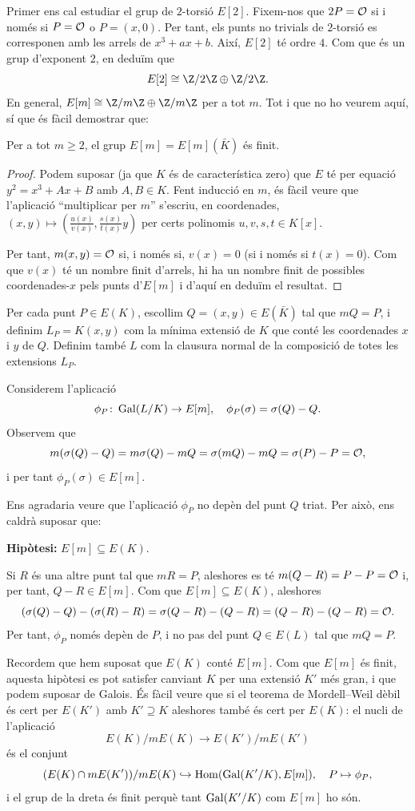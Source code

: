  Primer ens cal estudiar el grup de $2$-torsió $E[2]$. Fixem-nos que $2P=\mathcal{O}$ si i només si $P=\mathcal{O}$ o $P=(x,0)$. Per tant, els punts no trivials de $2$-torsió es corresponen amb les arrels de $x^3+ax+b$. Així, $E[2]$ té ordre $4$. Com que és un grup d'exponent $2$, en deduïm que
 \[
 E[2] \cong \Z/2\Z \oplus \Z/2\Z.
 \]
 En general, $E[m]\cong \Z/m\Z\oplus \Z/m\Z$ per a tot $m$. Tot i que no ho veurem aquí, sí que és fàcil demostrar que:
 
\begin{proposition}
Per a tot $m\geq 2$, el grup $E[m]=E[m](\bar K)$ és finit.
\end{proposition}
\begin{proof}
Podem suposar (ja que $K$ és de característica zero) que $E$ té per equació $y^2=x^3+Ax+B$ amb $A,B\in K$. Fent inducció en $m$, és fàcil veure que l'aplicació ``multiplicar per $m$'' s'escriu, en coordenades,
$(x,y)\mapsto \left(\frac{u(x)}{v(x)},\frac{s(x)}{t(x)}y\right)$ per certs polinomis $u,v,s,t\in K[x]$.

Per tant, $m(x,y) =\mathcal{O}$ si, i només si, $v(x)=0$ (si i només si $t(x)=0$). Com que $v(x)$ té un nombre finit d'arrels, hi ha un nombre finit de possibles coordenades-$x$ pels punts d'$E[m]$ i d'aquí en deduïm el resultat.
\end{proof}

Per cada punt $P\in E(K)$, escollim $Q=(x,y)\in E(\bar K)$ tal que $mQ=P$, i definim $L_P=K(x,y)$ com la mínima extensió de $K$ que conté les coordenades $x$ i $y$ de $Q$. Definim també $L$ com la clausura normal de la composició de totes les extensions $L_P$.

Considerem l'aplicació
\[
\phi_P\colon \operatorname{Gal}(L/K)\to E[m],\quad \phi_P(\sigma) = \sigma(Q)-Q.
\]
Observem que
\[
m(\sigma(Q)-Q) = m\sigma(Q)-mQ= \sigma(mQ)- mQ = \sigma(P)-P = \mathcal{O},
\]
i per tant $\phi_P(\sigma)\in E[m]$.

Ens agradaria veure que l'aplicació $\phi_P$ no depèn del punt $Q$ triat. Per això, ens caldrà suposar que:

\textbf{Hipòtesi: } $E[m]\subseteq E(K)$.

Si $R$ és una altre punt tal que $mR=P$, aleshores es té $m(Q-R)=P-P=\mathcal{O}$ i, per tant, $Q-R\in E[m]$. Com que $E[m]\subseteq E(K)$, aleshores
\[
(\sigma(Q)-Q) - (\sigma(R)-R) = \sigma(Q-R)-(Q-R) = (Q-R)-(Q-R)=\mathcal{O}.
\]
Per tant, $\phi_P$ només depèn de $P$, i no pas del punt $Q\in E(L)$ tal que $mQ=P$.

\begin{remark}
Recordem que hem suposat que $E(K)$ conté $E[m]$. Com que $E[m]$ és finit, aquesta hipòtesi es pot satisfer canviant $K$ per una extensió $K'$ més gran, i que podem suposar de Galois. És fàcil veure que si el teorema de Mordell--Weil dèbil és cert per $E(K')$ amb $K'\supseteq K$ aleshores també és cert per $E(K)$: el nucli de l'aplicació
\[
E(K)/mE(K)\to E(K')/mE(K')
\]
és el conjunt
\[
(E(K)\cap mE(K'))/mE(K)\hookrightarrow \operatorname{Hom}(\operatorname{Gal}(K'/K), E[m]),\quad P\mapsto\phi_P,
\]
i el grup de la dreta és finit perquè tant $\operatorname{Gal}(K'/K)$ com $E[m]$ ho són.
\end{remark}

